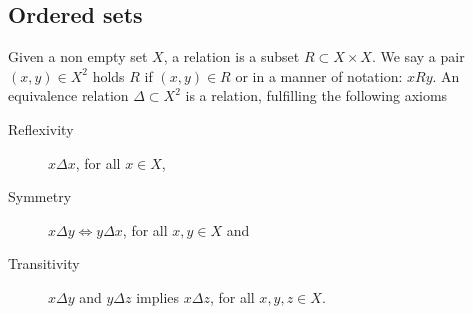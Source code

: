 \subsection{Ordered sets}
Given a non empty set $X$, a relation is a subset $R \subset X \times X$. We say a pair $(x,y) \in X^2$ holds $R$ if $(x,y) \in R$ or in a manner of notation: $x R y$. An equivalence relation $\Delta \subset X^2$ is a relation, fulfilling the following axioms
\begin{description}
\item[Reflexivity] $x \Delta x$, for all $x \in X$,
\item[Symmetry] $x \Delta y \Leftrightarrow y \Delta x$, for all $x, y \in X$ and
\item[Transitivity] $x \Delta y$ and $y \Delta z$ implies $x \Delta z$, for all $x, y, z \in X$.
\end{description}

